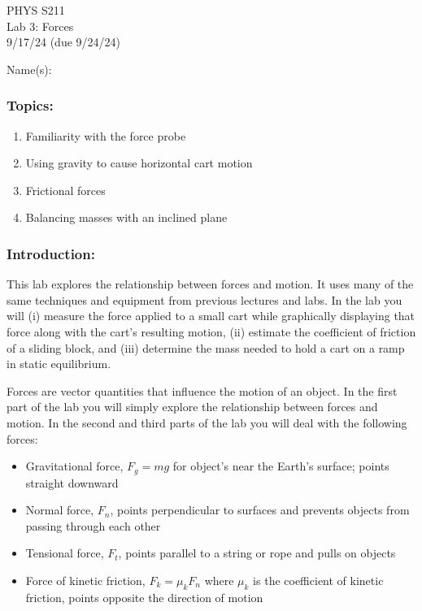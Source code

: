 \documentclass[11pt,letterpaper]{article}
\begin{document}
\setlength{\parindent}{0in}
\setlength{\itemsep}{0in}

\begin{flushright}
PHYS S211\\
Lab 3: Forces\\
9/17/24 (due 9/24/24)
\end{flushright}

Name(s):\\

\subsubsection*{Topics:}
\begin{enumerate}
\setlength{\parskip}{3pt}
\item Familiarity with the force probe
\item Using gravity to cause horizontal cart motion
\item Frictional forces
\item Balancing masses with an inclined plane
\end{enumerate}

\subsubsection*{Introduction:}
This lab explores the relationship between forces and motion. It uses many of the same techniques and equipment from previous lectures and labs. In the lab you will (i) measure the force applied to a small cart while graphically displaying that force along with the cart's resulting motion, (ii) estimate the coefficient of friction of a sliding block, and (iii) determine the mass needed to hold a cart on a ramp in static equilibrium.

Forces are vector quantities that influence the motion of an object. In the first part of the lab you will simply explore the relationship between forces and motion. In the second and third parts of the lab you will deal with the following forces:
\begin{itemize}
\setlength{\parskip}{3pt}
\item Gravitational force, $F_g = mg$ for object's near the Earth's surface; points straight downward
\item Normal force, $F_n$, points perpendicular to surfaces and prevents objects from passing through each other
\item Tensional force, $F_t$, points parallel to a string or rope and pulls on objects
\item Force of kinetic friction, $F_k=\mu_kF_n$ where $\mu_k$ is the coefficient of kinetic friction, points opposite the direction of motion
\end{itemize}
\end{document}

